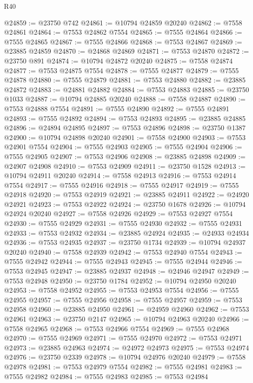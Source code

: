 \begin{lexlean}{R40}
\begin{coremodule}
@24859 := @23750 @742
@24861 := @10794 @24859 @20240
@24862 := @7558 @24861
@24864 := @7553 @24862 @7554
@24865 := @7555 @24864
@24866 := @7555 @24865
@24867 := @7555 @24866
@24868 := @7553 @24867
@24869 := @23885 @24859
@24870 := @24868 @24869
@24871 := @7553 @24870
@24872 := @23750 @891
@24874 := @10794 @24872 @20240
@24875 := @7558 @24874
@24877 := @7553 @24875 @7554
@24878 := @7555 @24877
@24879 := @7555 @24878
@24880 := @7555 @24879
@24881 := @7553 @24880
@24882 := @23885 @24872
@24883 := @24881 @24882
@24884 := @7553 @24883
@24885 := @23750 @1033
@24887 := @10794 @24885 @20240
@24888 := @7558 @24887
@24890 := @7553 @24888 @7554
@24891 := @7555 @24890
@24892 := @7555 @24891
@24893 := @7555 @24892
@24894 := @7553 @24893
@24895 := @23885 @24885
@24896 := @24894 @24895
@24897 := @7553 @24896
@24898 := @23750 @1387
@24900 := @10794 @24898 @20240
@24901 := @7558 @24900
@24903 := @7553 @24901 @7554
@24904 := @7555 @24903
@24905 := @7555 @24904
@24906 := @7555 @24905
@24907 := @7553 @24906
@24908 := @23885 @24898
@24909 := @24907 @24908
@24910 := @7553 @24909
@24911 := @23750 @1528
@24913 := @10794 @24911 @20240
@24914 := @7558 @24913
@24916 := @7553 @24914 @7554
@24917 := @7555 @24916
@24918 := @7555 @24917
@24919 := @7555 @24918
@24920 := @7553 @24919
@24921 := @23885 @24911
@24922 := @24920 @24921
@24923 := @7553 @24922
@24924 := @23750 @1678
@24926 := @10794 @24924 @20240
@24927 := @7558 @24926
@24929 := @7553 @24927 @7554
@24930 := @7555 @24929
@24931 := @7555 @24930
@24932 := @7555 @24931
@24933 := @7553 @24932
@24934 := @23885 @24924
@24935 := @24933 @24934
@24936 := @7553 @24935
@24937 := @23750 @1734
@24939 := @10794 @24937 @20240
@24940 := @7558 @24939
@24942 := @7553 @24940 @7554
@24943 := @7555 @24942
@24944 := @7555 @24943
@24945 := @7555 @24944
@24946 := @7553 @24945
@24947 := @23885 @24937
@24948 := @24946 @24947
@24949 := @7553 @24948
@24950 := @23750 @1784
@24952 := @10794 @24950 @20240
@24953 := @7558 @24952
@24955 := @7553 @24953 @7554
@24956 := @7555 @24955
@24957 := @7555 @24956
@24958 := @7555 @24957
@24959 := @7553 @24958
@24960 := @23885 @24950
@24961 := @24959 @24960
@24962 := @7553 @24961
@24963 := @23750 @2147
@24965 := @10794 @24963 @20240
@24966 := @7558 @24965
@24968 := @7553 @24966 @7554
@24969 := @7555 @24968
@24970 := @7555 @24969
@24971 := @7555 @24970
@24972 := @7553 @24971
@24973 := @23885 @24963
@24974 := @24972 @24973
@24975 := @7553 @24974
@24976 := @23750 @2339
@24978 := @10794 @24976 @20240
@24979 := @7558 @24978
@24981 := @7553 @24979 @7554
@24982 := @7555 @24981
@24983 := @7555 @24982
@24984 := @7555 @24983
@24985 := @7553 @24984

\end{coremodule}
\end{lexlean}
